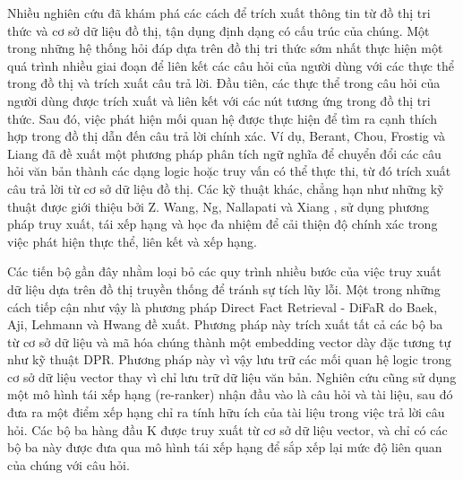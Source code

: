 Nhiều nghiên cứu đã khám phá các cách để trích xuất thông tin từ đồ thị tri thức và cơ sở dữ liệu đồ thị, tận dụng định dạng có cấu trúc của chúng. Một trong những hệ thống hỏi đáp dựa trên đồ thị tri thức sớm nhất thực hiện một quá trình nhiều giai đoạn để liên kết các câu hỏi của người dùng với các thực thể trong đồ thị và trích xuất câu trả lời. Đầu tiên, các thực thể trong câu hỏi của người dùng được trích xuất và liên kết với các nút tương ứng trong đồ thị tri thức. Sau đó, việc phát hiện mối quan hệ được thực hiện để tìm ra cạnh thích hợp trong đồ thị dẫn đến câu trả lời chính xác. Ví dụ, Berant, Chou, Frostig và Liang \cite{berant2013semantic} đã đề xuất một phương pháp phân tích ngữ nghĩa để chuyển đổi các câu hỏi văn bản thành các dạng logic hoặc truy vấn có thể thực thi, từ đó trích xuất câu trả lời từ cơ sở dữ liệu đồ thị. Các kỹ thuật khác, chẳng hạn như những kỹ thuật được giới thiệu bởi Z. Wang, Ng, Nallapati và Xiang \cite{wang2021retrieval}, sử dụng phương pháp truy xuất, tái xếp hạng và học đa nhiệm để cải thiện độ chính xác trong việc phát hiện thực thể, liên kết và xếp hạng.


Các tiến bộ gần đây nhằm loại bỏ các quy trình nhiều bước của việc truy xuất dữ liệu dựa trên đồ thị truyền thống để tránh sự tích lũy lỗi. Một trong những cách tiếp cận như vậy là phương pháp Direct Fact Retrieval - DiFaR do Baek, Aji, Lehmann và Hwang \cite{baek2023direct} đề xuất. Phương pháp này trích xuất tất cả các bộ ba từ cơ sở dữ liệu và mã hóa chúng thành một embedding vector dày đặc tương tự như kỹ thuật DPR. Phương pháp này vì vậy lưu trữ các mối quan hệ logic trong cơ sở dữ liệu vector thay vì chỉ lưu trữ dữ liệu văn bản. Nghiên cứu cũng sử dụng một mô hình tái xếp hạng (re-ranker) nhận đầu vào là câu hỏi và tài liệu, sau đó đưa ra một điểm xếp hạng chỉ ra tính hữu ích của tài liệu trong việc trả lời câu hỏi. Các bộ ba hàng đầu K được truy xuất từ cơ sở dữ liệu vector, và chỉ có các bộ ba này được đưa qua mô hình tái xếp hạng để sắp xếp lại mức độ liên quan của chúng với câu hỏi.


